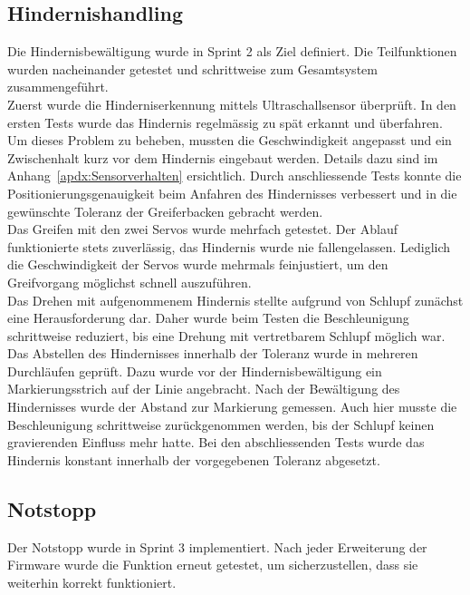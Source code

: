 \documentclass[main.tex]{subfiles} %
\begin{document}
\subsection*{Hindernishandling}
Die Hindernisbewältigung wurde in Sprint 2 als Ziel definiert. Die Teilfunktionen wurden nacheinander getestet und schrittweise zum Gesamtsystem zusammengeführt.\\
Zuerst wurde die Hinderniserkennung mittels Ultraschallsensor überprüft. In den ersten Tests wurde das Hindernis regelmässig zu spät erkannt
und überfahren. Um dieses Problem zu beheben, mussten die Geschwindigkeit angepasst und ein Zwischenhalt kurz vor dem Hindernis eingebaut werden.
Details dazu sind im Anhang~\ref{apdx:Sensorverhalten} ersichtlich. Durch anschliessende Tests konnte die Positionierungsgenauigkeit beim Anfahren
des Hindernisses verbessert und in die gewünschte Toleranz der Greiferbacken gebracht werden.\\
Das Greifen mit den zwei Servos wurde mehrfach getestet. Der Ablauf funktionierte stets zuverlässig, das Hindernis wurde nie fallengelassen.
Lediglich die Geschwindigkeit der Servos wurde mehrmals feinjustiert, um den Greifvorgang möglichst schnell auszuführen.\\
Das Drehen mit aufgenommenem Hindernis stellte aufgrund von Schlupf zunächst eine Herausforderung dar. Daher wurde beim Testen die Beschleunigung schrittweise
reduziert, bis eine Drehung mit vertretbarem Schlupf möglich war.\\
Das Abstellen des Hindernisses innerhalb der Toleranz wurde in mehreren Durchläufen geprüft. Dazu wurde vor der Hindernisbewältigung ein Markierungsstrich
auf der Linie angebracht. Nach der Bewältigung des Hindernisses wurde der Abstand zur Markierung gemessen. Auch hier musste die Beschleunigung schrittweise
zurückgenommen werden, bis der Schlupf keinen gravierenden Einfluss mehr hatte. Bei den abschliessenden Tests wurde das Hindernis konstant innerhalb der
vorgegebenen Toleranz abgesetzt.

\subsection*{Notstopp}
Der Notstopp wurde in Sprint 3 implementiert. Nach jeder Erweiterung der Firmware wurde die Funktion erneut getestet, um sicherzustellen,
dass sie weiterhin korrekt funktioniert.
\end{document}
